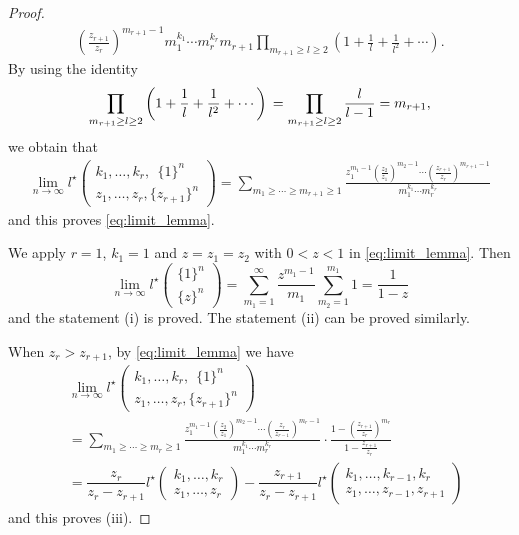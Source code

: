 \documentclass[12pt,a4paper]{article}
\theoremstyle{remark}
\begin{document}
\begin{proof}
\begin{align*}
{       (\frac{z_{r+1}}{z_{r}})^{m_{r+1}-1}}
     {m_1^{k_1} \cdots m_r^{k_r} m_{r+1} }  
\prod_{m_{r+1}\ge l \ge 2} 
\left(  1+\frac{1}{l}+\frac{1}{l^2}+\cdots \right).
\end{align*}
By using the identity
\[ \prod_{m_{r+1}\ge l \ge 2} 
\left(  1+\frac{1}{l}+\frac{1}{l^2}+\cdots \right)\\
=\prod_{m_{r+1}\ge l \ge 2} 
\frac{l}{l-1}
=m_{r+1},\]
we obtain that 
\begin{align*}
 \lim_{n\to \infty} l^{\star}
\begin{pmatrix}
k_1,\ldots , k_r, \ \ \{1\}^n\ \ \\
z_1, \ldots, z_r, \{z_{r+1}\}^n
\end{pmatrix}
=
\sum_{m_1\ge \cdots \ge m_{r+1}\ge 1}
\frac{z_1^{m_1-1} (\frac{z_2}{z_1})^{m_2-1} \cdots 
       (\frac{z_{r+1}}{z_{r}})^{m_{r+1}-1}}
     {m_1^{k_1} \cdots m_r^{k_r} }
    \end{align*}
and this proves \eqref{eq:limit_lemma}.




We apply
$r=1$, $k_1=1$ and $z=z_1=z_2$ with $0<z<1$
in \eqref{eq:limit_lemma}.
Then 
\[ \displaystyle \lim_{n\to \infty}    
l^{\star}
\begin{pmatrix}
\{1\}^{n}  \\
\{z\}^{n}  
\end{pmatrix}
=
\sum_{m_1=1}^{\infty} 
\frac{z^{m_1-1}}{m_1} \sum_{m_2=1}^{m_1}
1
= \dfrac{1}{1-z}\]
and the statement (i) is proved.
The statement (ii) can be proved similarly.

When $z_r> z_{r+1}$, by \eqref{eq:limit_lemma}
we have 
\begin{align*}
& \lim_{n\to \infty} l^{\star}
\begin{pmatrix}
k_1,\ldots , k_r, \ \ \{1\}^n\ \ \\
z_1, \ldots, z_r, \{z_{r+1}\}^n
\end{pmatrix} \\
&=
\sum_{m_1\ge \cdots \ge m_{r}\ge 1}
\frac{z_1^{m_1-1} (\frac{z_2}{z_1})^{m_2-1} \cdots 
       (\frac{z_{r}}{z_{r-1}})^{m_{r}-1}}
     {m_1^{k_1} \cdots m_r^{k_r} } \cdot 
\frac{1- ( \frac{z_{r+1}}{z_r})^{m_r}}
     {1- \frac{z_{r+1}}{z_r}} \\
&=\dfrac{z_r}{z_r-z_{r+1}}
 l^{\star}\begin{pmatrix}
k_1,\ldots , k_r\\
z_1, \ldots, z_r
\end{pmatrix}
-\dfrac{z_{r+1}}{z_r-z_{r+1}}
l^{\star}\begin{pmatrix}
k_1,\ldots, k_{r-1}, k_r\\
z_1, \ldots, z_{r-1}, z_{r+1}
\end{pmatrix}
\end{align*}
and this proves (iii).
\end{proof}
\end{document}
